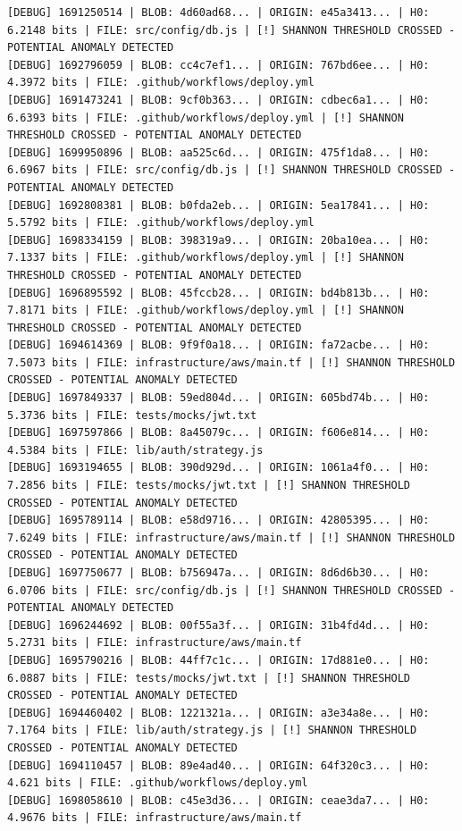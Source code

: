 \documentclass[12pt, a4paper, oneside]{report}
\begin{document}
\begin{lstlisting}[basicstyle=\tiny\ttfamily]
[DEBUG] 1691250514 | BLOB: 4d60ad68... | ORIGIN: e45a3413... | H0: 6.2148 bits | FILE: src/config/db.js | [!] SHANNON THRESHOLD CROSSED - POTENTIAL ANOMALY DETECTED
[DEBUG] 1692796059 | BLOB: cc4c7ef1... | ORIGIN: 767bd6ee... | H0: 4.3972 bits | FILE: .github/workflows/deploy.yml
[DEBUG] 1691473241 | BLOB: 9cf0b363... | ORIGIN: cdbec6a1... | H0: 6.6393 bits | FILE: .github/workflows/deploy.yml | [!] SHANNON THRESHOLD CROSSED - POTENTIAL ANOMALY DETECTED
[DEBUG] 1699950896 | BLOB: aa525c6d... | ORIGIN: 475f1da8... | H0: 6.6967 bits | FILE: src/config/db.js | [!] SHANNON THRESHOLD CROSSED - POTENTIAL ANOMALY DETECTED
[DEBUG] 1692808381 | BLOB: b0fda2eb... | ORIGIN: 5ea17841... | H0: 5.5792 bits | FILE: .github/workflows/deploy.yml
[DEBUG] 1698334159 | BLOB: 398319a9... | ORIGIN: 20ba10ea... | H0: 7.1337 bits | FILE: .github/workflows/deploy.yml | [!] SHANNON THRESHOLD CROSSED - POTENTIAL ANOMALY DETECTED
[DEBUG] 1696895592 | BLOB: 45fccb28... | ORIGIN: bd4b813b... | H0: 7.8171 bits | FILE: .github/workflows/deploy.yml | [!] SHANNON THRESHOLD CROSSED - POTENTIAL ANOMALY DETECTED
[DEBUG] 1694614369 | BLOB: 9f9f0a18... | ORIGIN: fa72acbe... | H0: 7.5073 bits | FILE: infrastructure/aws/main.tf | [!] SHANNON THRESHOLD CROSSED - POTENTIAL ANOMALY DETECTED
[DEBUG] 1697849337 | BLOB: 59ed804d... | ORIGIN: 605bd74b... | H0: 5.3736 bits | FILE: tests/mocks/jwt.txt
[DEBUG] 1697597866 | BLOB: 8a45079c... | ORIGIN: f606e814... | H0: 4.5384 bits | FILE: lib/auth/strategy.js
[DEBUG] 1693194655 | BLOB: 390d929d... | ORIGIN: 1061a4f0... | H0: 7.2856 bits | FILE: tests/mocks/jwt.txt | [!] SHANNON THRESHOLD CROSSED - POTENTIAL ANOMALY DETECTED
[DEBUG] 1695789114 | BLOB: e58d9716... | ORIGIN: 42805395... | H0: 7.6249 bits | FILE: infrastructure/aws/main.tf | [!] SHANNON THRESHOLD CROSSED - POTENTIAL ANOMALY DETECTED
[DEBUG] 1697750677 | BLOB: b756947a... | ORIGIN: 8d6d6b30... | H0: 6.0706 bits | FILE: src/config/db.js | [!] SHANNON THRESHOLD CROSSED - POTENTIAL ANOMALY DETECTED
[DEBUG] 1696244692 | BLOB: 00f55a3f... | ORIGIN: 31b4fd4d... | H0: 5.2731 bits | FILE: infrastructure/aws/main.tf
[DEBUG] 1695790216 | BLOB: 44ff7c1c... | ORIGIN: 17d881e0... | H0: 6.0887 bits | FILE: tests/mocks/jwt.txt | [!] SHANNON THRESHOLD CROSSED - POTENTIAL ANOMALY DETECTED
[DEBUG] 1694460402 | BLOB: 1221321a... | ORIGIN: a3e34a8e... | H0: 7.1764 bits | FILE: lib/auth/strategy.js | [!] SHANNON THRESHOLD CROSSED - POTENTIAL ANOMALY DETECTED
[DEBUG] 1694110457 | BLOB: 89e4ad40... | ORIGIN: 64f320c3... | H0: 4.621 bits | FILE: .github/workflows/deploy.yml
[DEBUG] 1698058610 | BLOB: c45e3d36... | ORIGIN: ceae3da7... | H0: 4.9676 bits | FILE: infrastructure/aws/main.tf

\end{lstlisting}
\end{document}
